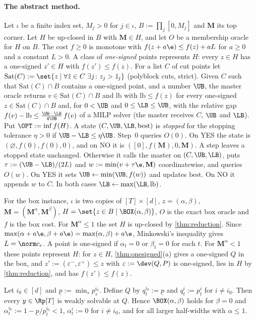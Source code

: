 \paragraph{The abstract method.}
Let $\iota$ be a finite index set, $M_j>0$ for $j\in\iota$, $B:=\prod_j[0,M_j]$ and $\mathbf M$ its top corner. Let $H$ be up-closed in $B$ with $\mathbf M\in H$, and let $O$ be a membership oracle for $H$ on $B$. The cost $f\ge0$ is monotone with $f(z+a\e)\le f(z)+aL$ for $a\ge0$ and a constant $L>0$. A class of \emph{one-signed} points represents $H$: every $z\in H$ has a one-signed $z'\in H$ with $f(z')\le f(z)$. For a list $C$ of cut points let $\mathrm{Sat}(C):=\set{z\mid\forall\hat z\in C\ \exists j\colon z_j>\hat z_j}$ (polyblock cuts, strict). Given $C$ such that $\mathrm{Sat}(C)\cap B$ contains a one-signed point, and a number $\UB$, the master oracle returns $v\in\mathrm{Sat}(C)\cap B$ and $\mathrm{lb}$ with $\mathrm{lb}\le f(z)$ for every one-signed $z\in\mathrm{Sat}(C)\cap B$ and, for $0<\UB$ and $0\le\LB\le\UB$, with the relative gap $f(v)-\mathrm{lb}\le\frac{\UB-\LB}{4\UB}\,f(v)$ of a MILP solver (the master receives $C$, $\UB$ and $\LB$). Put $\OPT:=\inf f(H)$. A state $(C,\UB,\LB,\mathrm{best})$ is \emph{stopped} for the stopping tolerance $\eta>0$ if $\UB-\LB\le\eta\UB$. Step~0 queries $O(0)$. On YES the state is $(\varnothing,f(0),f(0),0)$, and on NO it is $([0],f(\mathbf M),0,\mathbf M)$. A step leaves a stopped state unchanged. Otherwise it calls the master on $(C,\UB,\LB)$, puts $\tau:=(\UB-\LB)/(2L)$ and $w:=\min(v+\tau\e,\mathbf M)$ coordinatewise, and queries $O(w)$. On YES it sets $\UB\leftarrow\min(\UB,f(w))$ and updates $\mathrm{best}$. On NO it appends $w$ to $C$. In both cases $\LB\leftarrow\max(\LB,\mathrm{lb})$.

For the box instance, $\iota$ is two copies of $[T]\times[d]$, $z=(\alpha,\beta)$, $\mathbf M=(\mathbf M^\alpha,\mathbf M^\beta)$, $H=\set{z\in B\mid\BOX(\alpha,\beta)}$, $O$ is the exact box oracle and $f$ is the box cost. For $\mathbf M^\alpha\le1$ the set $H$ is up-closed by \cref{thm:reduction}. Since $\max(\alpha+a\e,\beta+a\e)=\max(\alpha,\beta)+a\e$, Minkowski's inequality gives $L=\norm c_r$. A point is one-signed if $\alpha_t=0$ or $\beta_t=0$ for each $t$. For $\mathbf M^\alpha<1$ these points represent $H$: for $z\in H$, \cref{thm:onesigned}(a) gives a one-signed $Q$ in the box, and $z':=(\varepsilon^-,\varepsilon^+)\le z$ with $\varepsilon:=\dev(Q,P)$ is one-signed, lies in $H$ by \cref{thm:reduction}, and has $f(z')\le f(z)$.

\begin{lemma}[nonemptiness]\label{lem:nonempty}
Let $i_0\in[d]$ and $\underline p:=\min_sp^{i_0}_s$. Define $Q$ by $q^{i_0}_t:=\underline p$ and $q^i_t:=p^i_t$ for $i\ne i_0$. Then every $y\in\Rp[T]$ is weakly solvable at $Q$. Hence $\BOX(\alpha,\beta)$ holds for $\beta=0$ and $\alpha^{i_0}_t:=1-\underline p/p^{i_0}_t<1$, $\alpha^i_t:=0$ for $i\ne i_0$, and for all larger half-widths with $\alpha\le1$.
\end{lemma}

